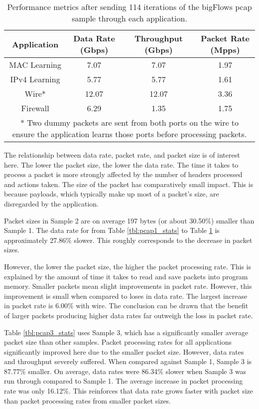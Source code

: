 \begin{table}
\caption{Performance metrics after sending 114 iterations of the bigFlows pcap sample through each application.}
\begin{center}
\begin{tabularx}{0.9\textwidth}{| c || c | c | c | }
\hline
Application & Data Rate (Gbps) & Throughput (Gbps) & Packet Rate (Mpps)  \\
\hline
MAC Learning & 7.07 & 7.07 & 1.97  \\
\hline
IPv4 Learning & 5.77 & 5.77 & 1.61  \\
\hline 
Wire* & 12.07 & 12.07 & 3.36 \\
\hline
Firewall & 6.29 & 1.35 & 1.75 \\
\hline
\multicolumn{4}{p{0.9\textwidth}}{* Two dummy packets are sent from both ports on the wire to ensure the application learns those ports before processing packets.}
\end{tabularx}
\end{center}
\label{tbl:pcap2_stats}
\end{table}


The relationship between data rate, packet rate, and packet size is of interest here.
The lower the packet size, the lower the data rate. The time it takes to process a packet is more strongly affected by the number of headers processed and actions taken. The size of the packet has comparatively small impact.
This is because payloads, which typically make up most of a packet's size, are disregarded by the application.

Packet sizes in Sample 2 are on average 197 bytes (or about 30.50\%) smaller than Sample 1. The data rate for from Table \ref{tbl:pcap1_stats} to Table \ref{tbl:pcap2_stats} is approximately 27.86\% slower. This roughly corresponds to the decrease in packet sizes.

However, the lower the packet size, the higher the packet processing rate.
This is explained by the amount of time it takes to read and save packets into program memory.
Smaller packets mean slight improvements in packet rate. However, this improvement is small when compared to loses in data rate.
The largest increase in packet rate is 6.00\% with wire. The conclusion can be drawn that the benefit of larger packets producing higher data rates far outweigh the loss in packet rate.

Table \ref{tbl:pcap3_stats} uses Sample 3, which has a significantly smaller average packet size than other samples. 
Packet processing rates for all applications significantly improved here due to the smaller packet size. However, data rates and throughput severely suffered. 
When compared against Sample 1, Sample 3 is 87.77\% smaller. On average, data rates were 86.34\% slower when Sample 3 was run through compared to Sample 1.
The average increase in packet processing rate was only 16.12\%. This reinforces that data rate grows faster with packet size than packet processing rates from smaller packet sizes.

